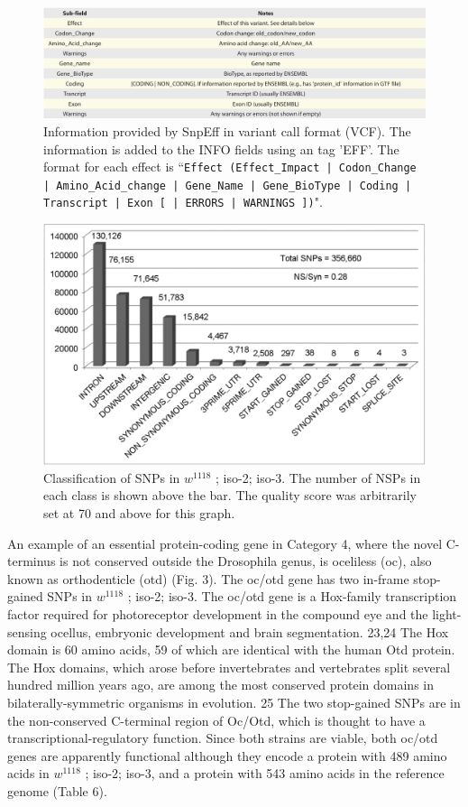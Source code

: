 \begin{figure}
    \centering
    \includegraphics[width=14cm]{snpeff_table4.png}
    \caption{Information provided by SnpEff in variant call format (VCF). The information is added to the INFO fields using an tag 'EFF'. The format for each effect is ``\texttt{Effect (Effect\_Impact | Codon\_Change | Amino\_Acid\_change | Gene\_Name | Gene\_BioType | Coding | Transcript | Exon [ | ERRORS | WARNINGS ])}".}
    \label{fig:snpeffTab3}
\end{figure}

\begin{figure}
    \centering
    \includegraphics[width=14cm]{snpeff_fig1.png}
    \caption{Classification of SNPs in $w^{1118}$ ; iso-2; iso-3. The number of NSPs in each class is shown above the bar. The quality score was arbitrarily set at 70 and above for this graph.}
    \label{fig:snpeffTab3}
\end{figure}

An example of an essential protein-coding gene in Category 4, where the novel C-terminus is not conserved outside the Drosophila genus, is oceliless (oc), also known as orthodenticle (otd) (Fig. 3). The oc/otd gene has two in-frame stop-gained SNPs in $w^{1118}$ ; iso-2; iso-3. The oc/otd gene is a Hox-family transcription factor required for photoreceptor development in the compound eye and the light-sensing ocellus, embryonic development and brain segmentation. 23,24 The Hox domain is 60 amino acids, 59 of which are identical with the human Otd protein. The Hox domains, which arose before invertebrates and vertebrates split several hundred million years ago, are among the most conserved protein domains in bilaterally-symmetric organisms in evolution. 25 The two stop-gained SNPs are in the non-conserved C-terminal region of Oc/Otd, which is thought to have a transcriptional-regulatory function. Since both strains are viable, both oc/otd genes are apparently functional although they encode a protein with 489 amino acids in $w^{1118}$ ; iso-2; iso-3, and a protein with 543 amino acids in the reference genome (Table 6).

